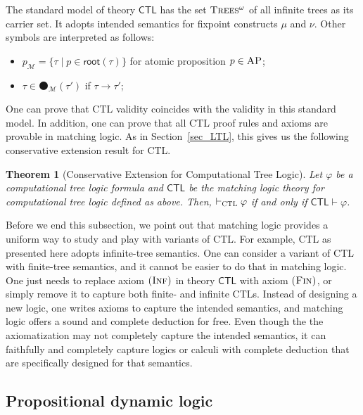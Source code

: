 \documentclass[letter,12pt]{article}
\newtheorem{theorem}{Theorem}
\newcommand{\MM}{\mathcal{M}}
\newcommand{\MLCTL}{\mathsf{CTL}}
\newcommand{\prule}[1]{\textsc{(#1)}}
\newcommand{\AP}{\textsc{AP}}
\newcommand{\snext}{{\medbullet}}
\newcommand{\rt}{\mathsf{root}}
\newcommand{\infTrees}{\textsc{Trees$^\omega$}\xspace}
\newcommand{\Inf}{\prule{Inf}\xspace}
\newcommand{\Fin}{\prule{Fin}\xspace}
\newcommand{\CTL}{{\textsc{CTL}}}
\begin{document}
The standard model of theory $\MLCTL$ has the set $\infTrees$ of all infinite trees
as its carrier set.
It adopts intended semantics for fixpoint constructs $\mu$ and $\nu$.
Other symbols are interpreted as follows:
\begin{itemize}
\item $p_\MM = \{ \tau \mid p \in \rt(\tau) \}$ for atomic proposition $p \in \AP$;
\item $\tau \in \snext_\MM(\tau')$ if $\tau \to \tau'$;
\end{itemize}
One can prove that CTL validity coincides with the validity in this standard model.
In addition, one can prove that all CTL proof rules and axioms are provable
in matching logic.
As in Section~\ref{sec_LTL},
this gives us the following conservative extension result for CTL.
\begin{theorem}[Conservative Extension for Computational Tree Logic]
Let $\varphi$ be a computational tree logic formula
and $\MLCTL$ be the matching logic theory for computational tree logic defined as above.
Then,
$\vdash_\CTL \varphi$ if and only if
$\MLCTL \vdash \varphi$.
\end{theorem}

Before we end this subsection, we point out that matching logic
provides a uniform way to study and play with variants of CTL.
For example, CTL as presented here adopts infinite-tree semantics.
One can consider a variant of CTL with finite-tree semantics, and it cannot be easier
to do that in matching logic.
One just needs to replace axiom $\Inf$ in theory $\MLCTL$ with axiom $\Fin$,
or simply remove it to capture both finite- and infinite CTLs.
Instead of designing a new logic, one writes axioms to capture
the intended semantics, and matching logic offers a sound and complete deduction for free.
Even though the the axiomatization may not completely capture the intended semantics,
it can faithfully and completely capture logics or calculi with complete deduction
that are specifically designed for that semantics.


\subsection{Propositional dynamic logic}
\end{document}
